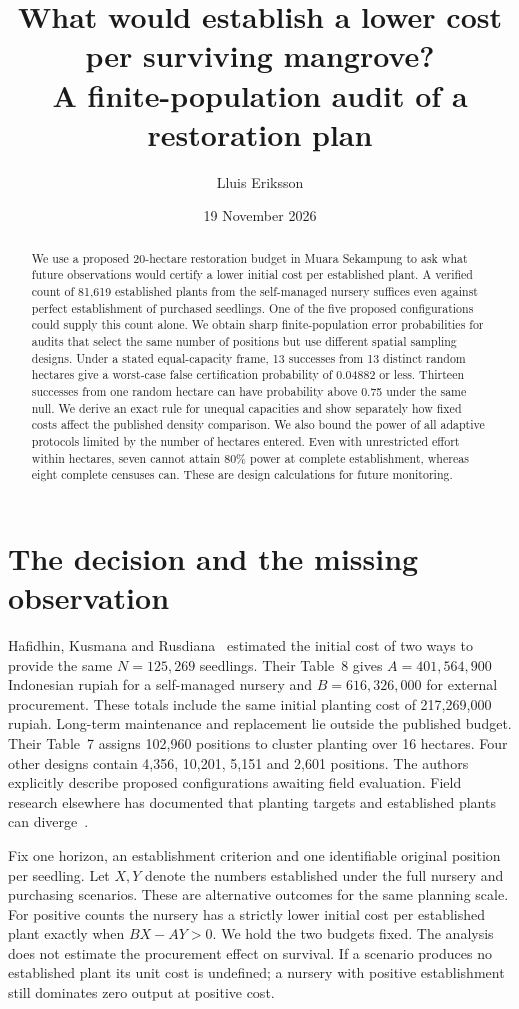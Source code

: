 \documentclass[10pt]{article}
\title{What would establish a lower cost per surviving mangrove?\\ A finite-population audit of a restoration plan}
\author{Lluis Eriksson}
\date{19 November 2026}
\begin{document}
\maketitle
\begin{abstract}
We use a proposed 20-hectare restoration budget in Muara Sekampung to ask what future observations would certify a lower initial cost per established plant. A verified count of 81,619 established plants from the self-managed nursery suffices even against perfect establishment of purchased seedlings. One of the five proposed configurations could supply this count alone. We obtain sharp finite-population error probabilities for audits that select the same number of positions but use different spatial sampling designs. Under a stated equal-capacity frame, 13 successes from 13 distinct random hectares give a worst-case false certification probability of 0.04882 or less. Thirteen successes from one random hectare can have probability above 0.75 under the same null. We derive an exact rule for unequal capacities and show separately how fixed costs affect the published density comparison. We also bound the power of all adaptive protocols limited by the number of hectares entered. Even with unrestricted effort within hectares, seven cannot attain 80\% power at complete establishment, whereas eight complete censuses can. These are design calculations for future monitoring.
\end{abstract}

\section{The decision and the missing observation}
Hafidhin, Kusmana and Rusdiana~\cite{plan} estimated the initial cost of two ways to provide the same $N=125{,}269$ seedlings. Their Table~8 gives $A=401{,}564{,}900$ Indonesian rupiah for a self-managed nursery and $B=616{,}326{,}000$ for external procurement. These totals include the same initial planting cost of 217,269,000 rupiah. Long-term maintenance and replacement lie outside the published budget. Their Table~7 assigns 102,960 positions to cluster planting over 16 hectares. Four other designs contain 4,356, 10,201, 5,151 and 2,601 positions. The authors explicitly describe proposed configurations awaiting field evaluation. Field research elsewhere has documented that planting targets and established plants can diverge~\cite{field}.

Fix one horizon, an establishment criterion and one identifiable original position per seedling. Let $X,Y$ denote the numbers established under the full nursery and purchasing scenarios. These are alternative outcomes for the same planning scale. For positive counts the nursery has a strictly lower initial cost per established plant exactly when $BX-AY>0$. We hold the two budgets fixed. The analysis does not estimate the procurement effect on survival. If a scenario produces no established plant its unit cost is undefined; a nursery with positive establishment still dominates zero output at positive cost.
\end{document}
